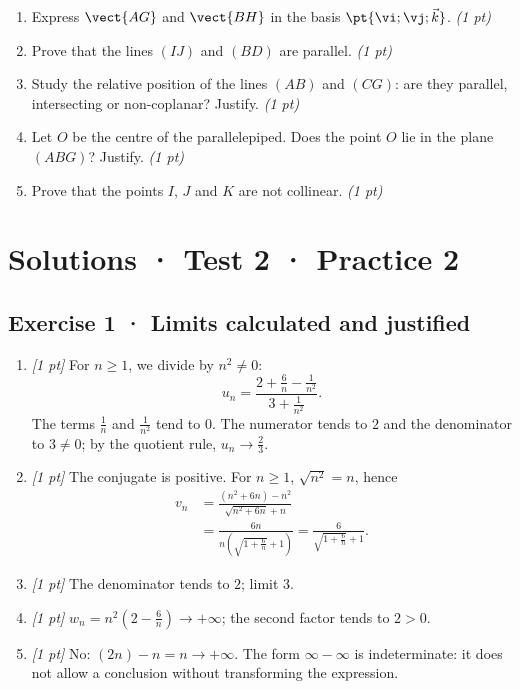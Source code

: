\begin{enumerate}

\item Express $\vect{AG}$ and $\vect{BH}$ in the basis $\pt{\vi;\vj;\vec k}$. \hfill\textit{(1 pt)}

\item Prove that the lines $(IJ)$ and $(BD)$ are parallel. \hfill\textit{(1 pt)}

\item Study the relative position of the lines $(AB)$ and $(CG)$: are they parallel, intersecting or non-coplanar? Justify. \hfill\textit{(1 pt)}

\item Let $O$ be the centre of the parallelepiped. Does the point $O$ lie in the plane $(ABG)$? Justify. \hfill\textit{(1 pt)}

\item Prove that the points $I$, $J$ and $K$ are not collinear. \hfill\textit{(1 pt)}

\end{enumerate}

\ifmxteacher\mxnewpage

\section*{Solutions · Test 2 · Practice 2}\label{cor:2-2}

\subsection*{Exercise 1 · Limits calculated and justified}\begin{enumerate}

\item \textit{[1 pt]} For $n\ge1$, we divide by $n^2\ne0$:
\[u_n=\frac{2+\frac{6}{n}-\frac{1}{n^2}}{3+\frac{1}{n^2}}.\]
The terms $\frac{1}{n}$ and $\frac{1}{n^2}$ tend to $0$. The numerator tends to $2$ and the denominator to $3\ne0$; by the quotient rule, $u_n\to\frac{2}{3}$.

\item \textit{[1 pt]} The conjugate is positive. For $n\ge1$, $\sqrt{n^2}=n$, hence
\[\begin{aligned}v_n&=\frac{(n^2+6n)-n^2}{\sqrt{n^2+6n}+n}\\&=\frac{6n}{n(\sqrt{1+\frac{6}{n}}+1)}=\frac{6}{\sqrt{1+\frac{6}{n}}+1}.\end{aligned}\]

\item \textit{[1 pt]} The denominator tends to $2$; limit $3$.

\item \textit{[1 pt]} $w_n=n^2(2-\frac{6}{n})\to+\infty$; the second factor tends to $2>0$.

\item \textit{[1 pt]} No: $(2n)-n=n\to+\infty$. The form $\infty-\infty$ is indeterminate: it does not allow a conclusion without transforming the expression.

\end{enumerate}

